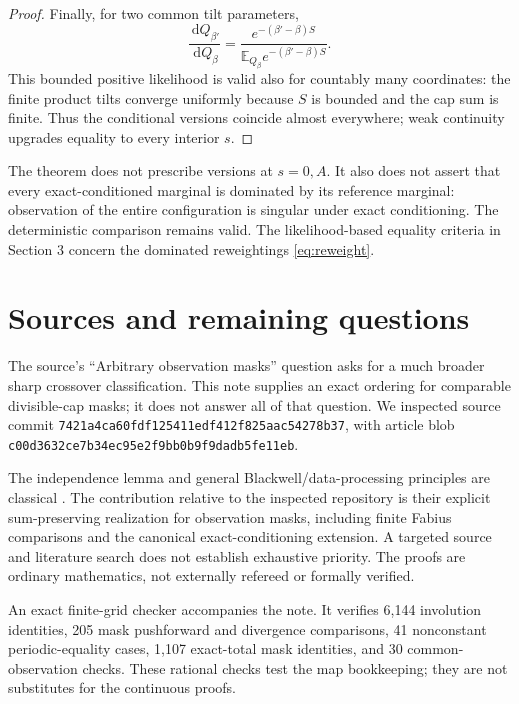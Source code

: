 \documentclass[11pt,a4paper]{article}
\theoremstyle{remark}\newtheorem*{ednote}{Editorial note (ProveIt, 2026-10-01)}
\newcommand{\E}{\mathbb E}\newcommand{\N}{\mathbb N}\newcommand{\R}{\mathbb R}
\newcommand{\dd}{\,\mathrm d}\newcommand{\ii}{\mathrm i}
\begin{document}
\begin{proof}
Finally, for two common tilt parameters,
\[
 \frac{\dd Q_{\beta'}}{\dd Q_\beta}
 =\frac{e^{-(\beta'-\beta)S}}
        {\E_{Q_\beta}e^{-(\beta'-\beta)S}}.
\]
This bounded positive likelihood is valid also for countably many coordinates: the finite product tilts converge uniformly because $S$ is bounded and the cap sum is finite. Thus the conditional versions coincide almost everywhere; weak continuity upgrades equality to every interior $s$.
\end{proof}
The theorem does not prescribe versions at $s=0,A$. It also does not assert that every exact-conditioned marginal is dominated by its reference marginal: observation of the entire configuration is singular under exact conditioning. The deterministic comparison remains valid. The likelihood-based equality criteria in Section 3 concern the dominated reweightings \eqref{eq:reweight}.

\section{Sources and remaining questions}
The source's ``Arbitrary observation masks'' question \cite{critical} asks for a much broader sharp crossover classification. This note supplies an exact ordering for comparable divisible-cap masks; it does not answer all of that question. We inspected source commit
\nolinkurl{7421a4ca60fdf125411edf412f825aac54278b37}, with article blob
\nolinkurl{c00d3632ce7b34ec95e2f9bb0b9f9dadb5fe11eb}.

The independence lemma and general Blackwell/data-processing principles are classical \cite{st,blackwell}. The contribution relative to the inspected repository is their explicit sum-preserving realization for observation masks, including finite Fabius comparisons and the canonical exact-conditioning extension. A targeted source and literature search does not establish exhaustive priority. The proofs are ordinary mathematics, not externally refereed or formally verified.

An exact finite-grid checker accompanies the note. It verifies 6,144 involution identities, 205 mask pushforward and divergence comparisons, 41 nonconstant periodic-equality cases, 1,107 exact-total mask identities, and 30 common-observation checks. These rational checks test the map bookkeeping; they are not substitutes for the continuous proofs.
\end{document}
